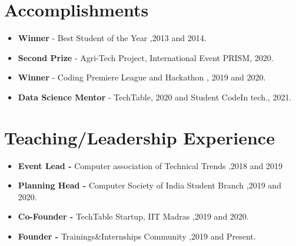\documentclass[letterpaper,11pt]{article}
\newcommand{\resumeItem}[2]{
  \item\small{
    \textbf{#1}{ #2 \vspace{-2pt}}
  }
}
\newcommand{\resumeSubItem}[2]{\resumeItem{#1}{#2}\vspace{-4pt}}
\newcommand{\resumeSubHeadingListStart}{\begin{itemize}[leftmargin=*]}
\newcommand{\resumeSubHeadingListEnd}{\end{itemize}}
\begin{document}
\section{Accomplishments}
 \resumeSubHeadingListStart
 \resumeSubItem{}{
    \textbf{Winner}{ - Best Student of the Year} {,2013 and 2014.}
    }
    \resumeSubItem{}{
    \textbf{Second Prize}{ - Agri-Tech Project}{, International Event PRISM, 2020. }
    }
    \resumeSubItem{}{
    \textbf{Winner}{ - Coding Premiere League and Hackathon} {, 2019 and 2020.}
    }
    \resumeSubItem{}{
    \textbf{Data Science Mentor}{ - TechTable, 2020 and Student CodeIn tech., 2021.}
    }
    
 \resumeSubHeadingListEnd
\section{Teaching/Leadership Experience}
 \resumeSubHeadingListStart
  \resumeSubItem{}{\textbf{Event Lead -} Computer association of Technical Trends {.2018 and 2019}}
  \resumeSubItem{}{\textbf{Planning Head -} Computer Society of India Student Branch {,2019 and 2020.}}
  \resumeSubItem{}{\textbf{Co-Founder -} TechTable Startup, IIT Madras {,2019 and 2020.}}
  \resumeSubItem{}{\textbf{Founder -} Trainings\&Internships Community {,2019 and Present.}}
 \resumeSubHeadingListEnd
\end{document}
